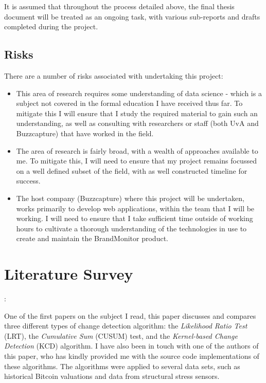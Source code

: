 \documentclass{uvamscse}
\begin{document}
It is assumed that throughout the process detailed above, the final thesis document will be treated as an ongoing task, with various sub-reports and drafts completed during the project.

\section{Risks}

There are a number of risks associated with undertaking this project:
\begin{itemize}
\item This area of research requires some understanding of data science - which is a subject not covered in the formal education I have received thus far. To mitigate this I will ensure that I study the required material to gain such an understanding, as well as consulting with researchers or staff (both UvA and Buzzcapture) that have worked in the field.
\item The area of research is fairly broad, with a wealth of approaches available to me. To mitigate this, I will need to ensure that my project remains focussed on a well defined subset of the field, with as well constructed timeline for success.
\item The host company (Buzzcapture) where this project will be undertaken, works primarily to develop web applications, within the team that I will be working. I will need to ensure that I take sufficient time outside of working hours to cultivate a thorough understanding of the technologies in use to create and maintain the BrandMonitor product.
\end{itemize}

\chapter{Literature Survey}

\noindent\cite{BuntainChanges2014}: \textbf{}\smallskip

\noindent One of the first papers on the subject I read, this paper discusses and compares three different types of change detection algorithm: the \textit{Likelihood Ratio Test} (LRT), the \textit{Cumulative Sum} (CUSUM) test, and the \textit{Kernel-based Change Detection} (KCD) algorithm. I have also been in touch with one of the authors of this paper, who has kindly provided me with the source code implementations of these algorithms. The algorithms were applied to several data sets, such as historical Bitcoin valuations and data from structural stress sensors.\bigskip
\end{document}

